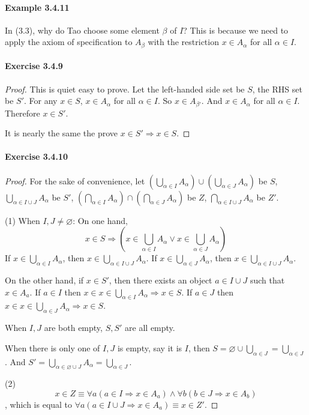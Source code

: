 \paragraph{Example 3.4.11}
In (3.3), why do Tao choose some element $\beta$ of $I$? This is because we need to apply the axiom of 
specification to $A_\beta$ with the restriction $x \in A_\alpha$ for all $\alpha \in I$.

\paragraph{Exercise 3.4.9} \label{exercise3.4.9}
\begin{proof}
This is quiet easy to prove. Let the left-handed side set be $S$, the RHS set be $S'$. For any 
$x \in S$, $x \in A_\alpha$ for all $\alpha \in I$. So $x \in A_{\beta'}$. And $x \in A_\alpha$ for all 
$\alpha \in I$. Therefore $x \in S'$. 

It is nearly the same the prove $x \in S' \Longrightarrow x \in S$.
\end{proof}

\paragraph{Exercise 3.4.10} \label{exercise3.4.10}
\begin{proof}
For the sake of convenience, let 
$(\bigcup_{\alpha \in I} A_{\alpha})\cup(\bigcup_{\alpha \in J}A_{\alpha})$ be $S$, \\
$\bigcup_{\alpha \in I \cup J} A_{\alpha}$ be $S'$, 
$(\bigcap_{\alpha \in I} A_{\alpha})\cap(\bigcap_{\alpha \in J}A_{\alpha})$ be $Z$,
$\bigcap_{\alpha \in I \cup J} A_{\alpha}$ be $Z'$.

(1) When $I,J \neq \varnothing$: 
On one hand, 
\[
x \in S \Longrightarrow (x \in \bigcup_{\alpha \in I} A_{\alpha} \vee 
x \in \bigcup_{\alpha \in J}A_{\alpha})
\]
If $x \in \bigcup_{\alpha \in I} A_{\alpha}$, then $x \in \bigcup_{\alpha \in I \cup J} A_{\alpha}$.
If $x \in \bigcup_{\alpha \in J} A_{\alpha}$, then $x \in \bigcup_{\alpha \in I \cup J} A_{\alpha}$.

On the other hand, if $x \in S'$, then there exists an object $a \in I \cup J$ such that $x \in A_a$.
If $a \in I$ then $x \in x \in \bigcup_{\alpha \in I} A_{\alpha} \Longrightarrow x \in S$.
If $a \in J$ then $x \in x \in \bigcup_{\alpha \in J} A_{\alpha} \Longrightarrow x \in S$.

When $I,J$ are both empty, $S,S'$ are all empty.

When there is only one of $I,J$ is empty, say it is $I$, then 
$S = \varnothing \cup \bigcup_{\alpha \in J} = \bigcup_{\alpha \in J}$. And 
$S' = \bigcup_{\alpha \in \varnothing \cup J} A_{\alpha} = \bigcup_{\alpha \in J}$.

(2)
\[
x \in Z \equiv \forall a(a \in I \Longrightarrow x \in A_a) \wedge 
\forall b(b \in J \Longrightarrow x \in A_b)
\], which is equal to $\forall a(a \in I \cup J \Longrightarrow x \in A_a) \equiv x \in Z'$.
\end{proof}

